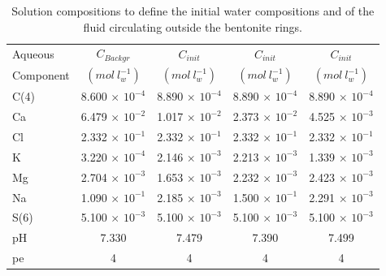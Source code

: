 \begin{table}[b]
\caption{Solution compositions to define the initial water compositions and of the fluid circulating outside the bentonite rings.}
\begin{center}
\begin{tabular}{l c c c c}
\hline
 Aqueous      & $C_{Backgr}$            & $C_{init}$               & $C_{init}$                & $C_{init}$  \\
 Component    & $(mol\ l^{-1}_w)$       & $(mol\ l^{-1}_w)$        & $(mol\ l^{-1}_w)$         & $(mol\ l^{-1}_w)$   \\ \hline
 C(4)         & 8.600 $\times$ $10^{-4}$  & 8.890 $\times$ $10^{-4}$ & 8.890 $\times$ $10^{-4}$  & 8.890 $\times$ $10^{-4}$\\
 Ca           & 6.479 $\times$ $10^{-2}$  & 1.017 $\times$ $10^{-2}$ & 2.373 $\times$ $10^{-2}$  & 4.525 $\times$ $10^{-3}$\\
 Cl           & 2.332 $\times$ $10^{-1}$  & 2.332 $\times$ $10^{-1}$ & 2.332 $\times$ $10^{-1}$  & 2.332 $\times$ $10^{-1}$ \\
 K            & 3.220 $\times$ $10^{-4}$  & 2.146 $\times$ $10^{-3}$ & 2.213 $\times$ $10^{-3}$  & 1.339 $\times$ $10^{-3}$\\
 Mg           & 2.704 $\times$ $10^{-3}$  & 1.653 $\times$ $10^{-3}$ & 2.232 $\times$ $10^{-3}$  & 2.423 $\times$ $10^{-3}$\\
 Na           & 1.090 $\times$ $10^{-1}$  & 2.185 $\times$ $10^{-3}$ & 1.500 $\times$ $10^{-1}$  & 2.291 $\times$ $10^{-3}$ \\ 
 S(6)         & 5.100 $\times$ $10^{-3}$  & 5.100 $\times$ $10^{-3}$ & 5.100 $\times$ $10^{-3}$  & 5.100 $\times$ $10^{-3}$\\ 
 pH           &   7.330	                  &  7.479                   & 7.390                     & 7.499 \\
 pe           &   4                       &  4                       &   4                       & 4     \\ \hline
\end{tabular}
\label{ex_wallis_aqu_conc}
\end{center}
\end{table}
	

